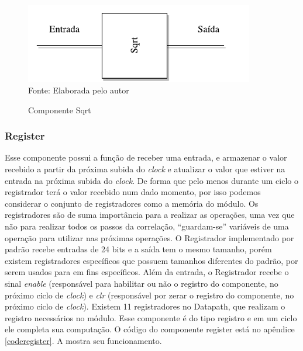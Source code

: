 \begin{figure}[H]
	\centering
	\caption{Componente Sqrt}
	\includegraphics[width=10cm]{figures/sqrt.pdf}\\
	
	
	{Fonte: Elaborada pelo autor}
	\label{Sqrt}
\end{figure}

\subsubsection{Register}
Esse componente possui a função de receber uma entrada, e armazenar o valor recebido a partir da próxima subida do \textit{clock} e atualizar o valor que estiver na entrada na próxima subida do \textit{clock}. De forma que pelo menos durante um ciclo o registrador terá o valor recebido num dado momento, por isso podemos considerar o conjunto de registradores como a memória do módulo. Os registradores são de suma importância para a realizar as operações, uma vez que não para realizar todos os passos da correlação, “guardam-se” variáveis de uma operação para utilizar nas próximas operações. O Registrador implementado por padrão recebe entradas de 24 bits e a saída tem o mesmo tamanho, porém existem registradores específicos que possuem tamanhos diferentes do padrão, por serem usados para em fins específicos. Além da entrada, o Registrador recebe o sinal \textit{enable} (responsável para habilitar ou não o registro do componente, no próximo ciclo de \textit{clock}) e \textit{clr} (responsável por zerar o registro do componente, no próximo ciclo de \textit{clock}). Existem 11 registradores no Datapath, que realizam o registro necessários no módulo. Esse componente é do tipo registro e em um ciclo ele completa sua computação. O código do componente register está no apêndice \ref{coderegister}. A  mostra seu funcionamento.

